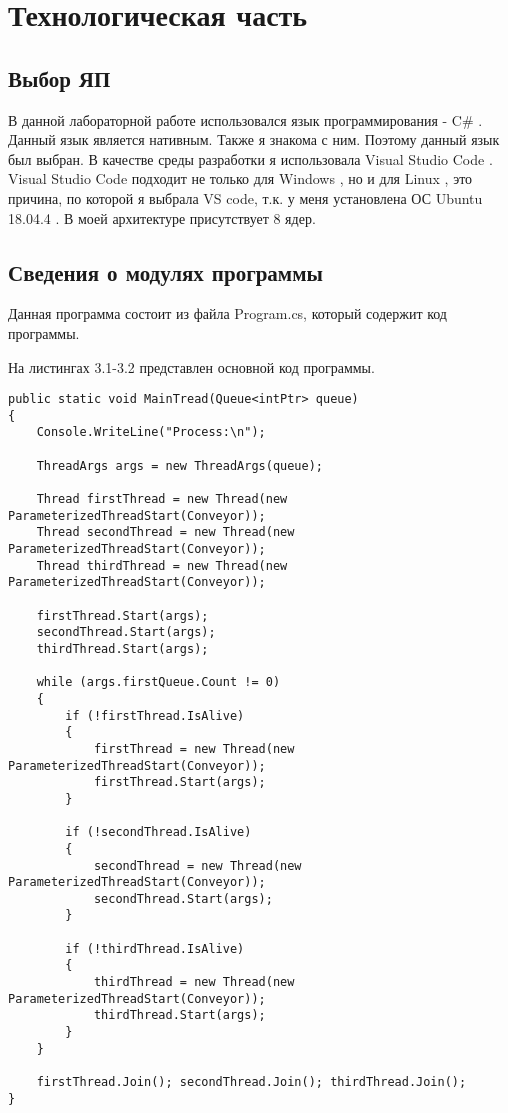 \chapter{Технологическая часть}

\section{Выбор ЯП}

В данной лабораторной работе использовался язык программирования - C\# \cite{Microsoft}.
Данный язык является нативным.
Также я знакома с ним.
Поэтому данный язык был выбран.
В качестве среды разработки я использовала Visual Studio Code \cite{Vs}.
Visual Studio Code подходит не только для  Windows \cite{Win},
но и для Linux \cite{Lin}, это причина,
по которой я выбрала VS code,
т.к. у меня установлена ОС Ubuntu 18.04.4 \cite{Ubuntu}.
В моей архитектуре присутствует 8 ядер.


\section{Сведения о модулях программы}

Данная программа состоит из файла Program.cs, который содержит код программы.

На листингах 3.1-3.2 представлен основной код программы.

\begin{lstlisting}[label=some-code,caption=Метод создания и запуска потоков]
public static void MainTread(Queue<intPtr> queue)
{
	Console.WriteLine("Process:\n");
	
	ThreadArgs args = new ThreadArgs(queue);
	
	Thread firstThread = new Thread(new ParameterizedThreadStart(Conveyor));
	Thread secondThread = new Thread(new ParameterizedThreadStart(Conveyor));
	Thread thirdThread = new Thread(new ParameterizedThreadStart(Conveyor));
	
	firstThread.Start(args);
	secondThread.Start(args);
	thirdThread.Start(args);

	while (args.firstQueue.Count != 0)
	{
		if (!firstThread.IsAlive)
		{
			firstThread = new Thread(new ParameterizedThreadStart(Conveyor));
			firstThread.Start(args);
		}
	
		if (!secondThread.IsAlive)
		{
			secondThread = new Thread(new ParameterizedThreadStart(Conveyor));
			secondThread.Start(args);
		}
	
		if (!thirdThread.IsAlive)
		{
			thirdThread = new Thread(new ParameterizedThreadStart(Conveyor));
			thirdThread.Start(args);
		}
	}
	
	firstThread.Join(); secondThread.Join(); thirdThread.Join();
}
\end{lstlisting}

